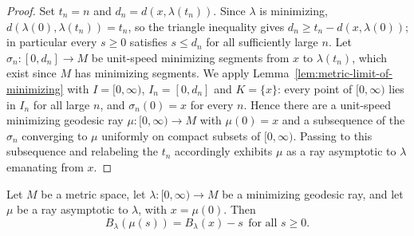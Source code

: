 \begin{proof}
\leanok
{}
Set $t_n=n$ and $d_n=d(x,\lambda(t_n))$. Since $\lambda$ is
minimizing, $d(\lambda(0),\lambda(t_n))=t_n$, so the triangle
inequality gives $d_n\ge t_n-d(x,\lambda(0))$; in particular every
$s\ge0$ satisfies $s\le d_n$ for all sufficiently large $n$. Let
$\sigma_n\colon[0,d_n]\to M$ be unit-speed minimizing segments from
$x$ to $\lambda(t_n)$, which exist since $M$ has minimizing
segments. We apply Lemma~\ref{lem:metric-limit-of-minimizing} with
$I=[0,\infty)$, $I_n=[0,d_n]$ and $K=\{x\}$: every point of
$[0,\infty)$ lies in $I_n$ for all large $n$, and $\sigma_n(0)=x$
for every $n$. Hence there are a unit-speed minimizing geodesic ray
$\mu\colon[0,\infty)\to M$ with $\mu(0)=x$ and a subsequence of the
$\sigma_n$ converging to $\mu$ uniformly on compact subsets of
$[0,\infty)$. Passing to this subsequence and relabeling the $t_n$
accordingly exhibits $\mu$ as a ray asymptotic to $\lambda$
emanating from $x$.
\end{proof}

\begin{lemma}
\label{lem:asymptotic-ray}
\leanok
{}
Let $M$ be a metric space, let $\lambda\colon[0,\infty)\to M$ be a
minimizing geodesic ray, and let $\mu$ be a ray asymptotic to
$\lambda$, with $x=\mu(0)$. Then
$$B_\lambda(\mu(s))=B_\lambda(x)-s\ \ \text{for all } s\ge 0.$$
\end{lemma}

